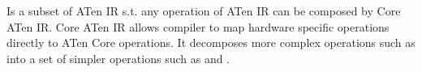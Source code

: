 \begin{defnbox}\nospacing
    \begin{defn}\label{defn:core_aten_ir}
        Is a subset of ATen IR s.t. any operation of ATen IR can be composed by Core ATen IR.
        Core ATen IR allows compiler to map hardware specific operations directly to ATen Core operations.
        It decomposes more complex operations such as  into a set of simpler operations
        such as  and .
    \end{defn}
\end{defnbox}
